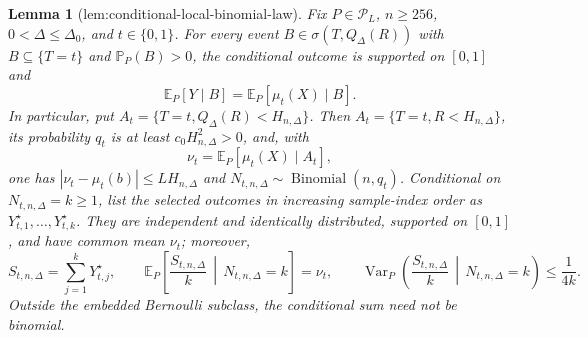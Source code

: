 \documentclass{article}
\newtheorem{lemma}{Lemma}
\begin{document}
\begin{lemma}[lem:conditional-local-binomial-law]\label{lem:conditional-local-binomial-law}
Fix \(P\in\mathcal P_L\), \(n\geq256\), \(0<\Delta\leq\Delta_0\), and \(t\in\{0,1\}\).  For every event \(B\in\sigma(T,Q_\Delta(R))\) with \(B\subseteq\{T=t\}\) and \(\mathbb P_P(B)>0\), the conditional outcome is supported on \([0,1]\) and
\[
 \mathbb E_P[Y\mid B]=\mathbb E_P[\mu_t(X)\mid B].
\]
In particular, put \(A_t=\{T=t,Q_\Delta(R)<H_{n,\Delta}\}\).  Then \(A_t=\{T=t,R<H_{n,\Delta}\}\), its probability \(q_t\) is at least \(c_0H_{n,\Delta}^2>0\), and, with
\[
 \nu_t=\mathbb E_P[\mu_t(X)\mid A_t],
\]
one has \(|\nu_t-\mu_t(b)|\leq LH_{n,\Delta}\) and \(N_{t,n,\Delta}\sim\operatorname{Binomial}(n,q_t)\).  Conditional on \(N_{t,n,\Delta}=k\geq1\), list the selected outcomes in increasing sample-index order as \(Y_{t,1}^{\star},\ldots,Y_{t,k}^{\star}\).  They are independent and identically distributed, supported on \([0,1]\), and have common mean \(\nu_t\); moreover,
\[
 S_{t,n,\Delta}=\sum_{j=1}^kY_{t,j}^{\star},\qquad
 \mathbb E_P\!\left[\frac{S_{t,n,\Delta}}k\,\middle|\,N_{t,n,\Delta}=k\right]=\nu_t,
 \qquad
 \operatorname{Var}_P\!\left(\frac{S_{t,n,\Delta}}k\,\middle|\,N_{t,n,\Delta}=k\right)\leq\frac1{4k}.
\]
Outside the embedded Bernoulli subclass, the conditional sum need not be binomial.
\end{lemma}
\end{document}
